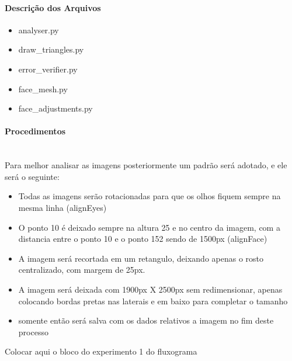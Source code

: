 \paragraph{Descrição dos Arquivos}
\begin{itemize}
    \item{analyser.py}

    \item{draw\_triangles.py}

    \item{error\_verifier.py}

    \item{face\_mesh.py}

    \item{face\_adjustments.py}

\end{itemize}

\paragraph{Procedimentos}\mbox{}\\



Para melhor analisar as imagens posteriormente um padrão será adotado, e ele será o seguinte:
\begin{itemize}
    \item{Todas as imagens serão rotacionadas para que os olhos fiquem sempre na mesma linha (alignEyes)}
    \item{O ponto 10 é deixado sempre na altura 25 e no centro da imagem, com a distancia entre o ponto 10 e o ponto 152 sendo de 1500px (alignFace)}
    \item{A imagem será recortada em um retangulo, deixando apenas o rosto centralizado, com margem de 25px.}
    \item{A imagem será deixada com 1900px X 2500px sem redimensionar, apenas colocando bordas pretas nas laterais e em baixo para completar o tamanho}
    \item{somente então será salva com os dados relativos a imagem no fim deste processo}
\end{itemize}
Colocar aqui o bloco do experimento 1 do fluxograma


